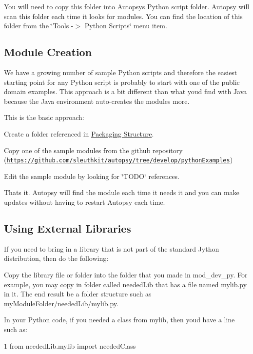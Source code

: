 You will need to copy this folder into Autopsy\textquotesingle{}s Python script folder. Autopsy will scan this folder each time it looks for modules. You can find the location of this folder from the \char`\"{}\+Tools -\/$>$ Python Scripts\char`\"{} menu item.\hypertarget{mod_dev_py_page_mod_dev_py_create_create}{}\subsection{Module Creation}\label{mod_dev_py_page_mod_dev_py_create_create}
We have a growing number of sample Python scripts and therefore the easiest starting point for any Python script is probably to start with one of the public domain examples. This approach is a bit different than what you\textquotesingle{}d find with Java because the Java environment auto-\/creates the modules more.

This is the basic approach\+:


\begin{DoxyEnumerate}
\item Create a folder referenced in \hyperlink{mod_dev_py_page_mod_dev_py_create_dir}{Packaging Structure}.
\item Copy one of the sample modules from the github repository (\href{https://github.com/sleuthkit/autopsy/tree/develop/pythonExamples}{\tt https\+://github.\+com/sleuthkit/autopsy/tree/develop/python\+Examples})
\item Edit the sample module by looking for \char`\"{}\+T\+O\+D\+O\char`\"{} references.
\end{DoxyEnumerate}

That\textquotesingle{}s it. Autopsy will find the module each time it needs it and you can make updates without having to restart Autopsy each time.\hypertarget{mod_dev_py_page_mod_dev_py_library}{}\subsection{Using External Libraries}\label{mod_dev_py_page_mod_dev_py_library}
If you need to bring in a library that is not part of the standard Jython distribution, then do the following\+:


\begin{DoxyEnumerate}
\item Copy the library file or folder into the folder that you made in mod\+\_\+dev\+\_\+py. For example, you may copy in folder called \textquotesingle{}needed\+Lib\textquotesingle{} that has a file named mylib.\+py in it. The end result be a folder structure such as my\+Module\+Folder/needed\+Lib/mylib.\+py.
\item In your Python code, if you needed a class from mylib, then you\textquotesingle{}d have a line such as\+: 
\begin{DoxyCode}
1 \textcolor{keyword}{from} neededLib.mylib \textcolor{keyword}{import} neededClass
\end{DoxyCode}

\end{DoxyEnumerate}


